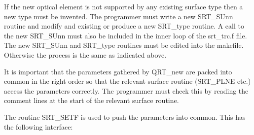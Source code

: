 \documentclass[letterpaper,10pt,english]{sphinxmanual}
\begin{document}
If the new optical element is not supported by any existing surface
type then a new type must be invented. The programmer must write
a new SRT\_SUnn routine and modify and existing
or produce a new SRT\_type routine.
A call to the new SRT\_SUnn must also be included in the inner loop
of the srt\_trc.f file. The new SRT\_SUnn and SRT\_type routines
must be edited into the makefile. Otherwise the process is
the same as indicated above.

It is important that the parameters gathered by QRT\_new are packed into
common in the right order so that the relevant surface routine
(SRT\_PLNE etc.) access the parameters correctly. The programmer
must check this by reading the comment lines at the start of
the relevant surface routine.

The routine SRT\_SETF is used to push the parameters into common.
This has the following interface:

%
\begin{sphinxVerbatim}[commandchars=\\\{\}]
          
             
         
          
          
      
         
              
              
     
   
\end{sphinxVerbatim}
\end{document}
